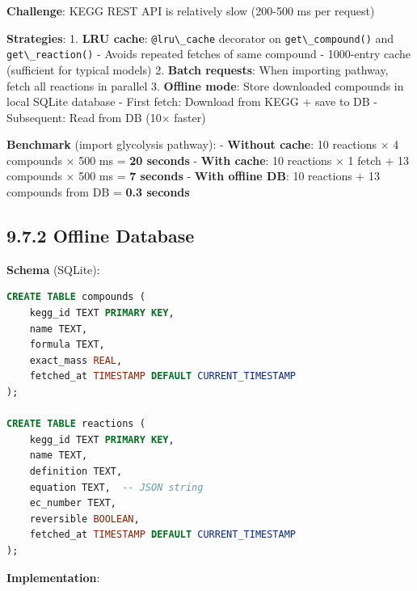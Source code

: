 \textbf{Challenge}: KEGG REST API is relatively slow (200-500 ms per
request)

\textbf{Strategies}: 1. \textbf{LRU cache}:
\passthrough{\lstinline!@lru\_cache!} decorator on
\passthrough{\lstinline!get\_compound()!} and
\passthrough{\lstinline!get\_reaction()!} - Avoids repeated fetches of
same compound - 1000-entry cache (sufficient for typical models) 2.
\textbf{Batch requests}: When importing pathway, fetch all reactions in
parallel 3. \textbf{Offline mode}: Store downloaded compounds in local
SQLite database - First fetch: Download from KEGG + save to DB -
Subsequent: Read from DB (10× faster)

\textbf{Benchmark} (import glycolysis pathway): - \textbf{Without
cache}: 10 reactions × 4 compounds × 500 ms = \textbf{20 seconds} -
\textbf{With cache}: 10 reactions × 1 fetch + 13 compounds × 500 ms =
\textbf{7 seconds} - \textbf{With offline DB}: 10 reactions + 13
compounds from DB = \textbf{0.3 seconds}

\hypertarget{offline-database}{%
\subsection{9.7.2 Offline Database}\label{offline-database}}

\textbf{Schema} (SQLite):

\begin{lstlisting}[language=SQL]
CREATE TABLE compounds (
    kegg_id TEXT PRIMARY KEY,
    name TEXT,
    formula TEXT,
    exact_mass REAL,
    fetched_at TIMESTAMP DEFAULT CURRENT_TIMESTAMP
);

CREATE TABLE reactions (
    kegg_id TEXT PRIMARY KEY,
    name TEXT,
    definition TEXT,
    equation TEXT,  -- JSON string
    ec_number TEXT,
    reversible BOOLEAN,
    fetched_at TIMESTAMP DEFAULT CURRENT_TIMESTAMP
);
\end{lstlisting}

\textbf{Implementation}:

